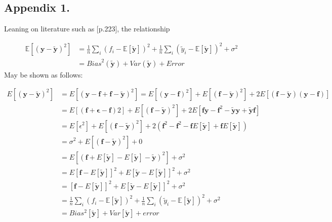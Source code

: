 \documentclass[%
oneside,                 %
final,                   %
10pt]{article}
\begin{document}
\begin{appendices}
\section*{Appendix 1.} \label{APP_1}
Leaning on literature such as \citep{HastieTrevor2009TEoS}[p.223], the relationship

\begin{align*}
\mathbb{E}\left[(\bm{y}-\bm{\tilde{y}})^2\right]&=\frac{1}{n}\sum_i(f_i-\mathbb{E}\left[\bm{\tilde{y}}\right])^2+\frac{1}{n}\sum_i(\tilde{y}_i-\mathbb{E}\left[\bm{\tilde{y}}\right])^2+\sigma^2 \\
&=\mathit{Bias}^2(\bm{\tilde{y}})+\mathit{Var}(\bm{\tilde{y}})+Error
\end{align*}
May be shown as follows:

\begin{align*}
E[(\bm{y}−\tilde{\bm{y}})^2]
&=E[(\bm{y}−\bm{f}+\bm{f}−\tilde{\bm{y}})^2]=E[(\bm{y}−\bm{f})^2]+E[(\bm{f}−\tilde{\bm{y}})^2]+2E[(\bm{f}−\tilde{\bm{y}})(\bm{y}−\bm{f})]\\
&=E[(\bm{f}+\bm{\epsilon}−\bm{f})2]+E[(\bm{f}−\tilde{\bm{y}})^2]+2E[\bm{f}\bm{y}−\bm{f}^2−\tilde{\bm{y}}\bm{y}+\tilde{\bm{y}}\bm{f}]\\
&=E[\epsilon^2]+E[(\bm{f}−\tilde{\bm{y}})^2]+2(\bm{f}^2−\bm{f}^2−\bm{f}E[\tilde{\bm{y}}]+\bm{f}E[\tilde{\bm{y}}])\\
&=\sigma^2+E[(\bm{f}−\tilde{\bm{y}})^2]+0\\
&=E[(\bm{f}+E[\tilde{\bm{y}}]−E[\tilde{\bm{y}}]−\tilde{\bm{y}})^2] + \sigma^2\\
&=E[\bm{f}−E[\tilde{\bm{y}}]]^2+E[\tilde{\bm{y}}−E[\tilde{\bm{y}}]]^2 + \sigma^2\\
&=[\bm{f}−E[\tilde{\bm{y}}]]^2+E[\tilde{\bm{y}}−E[\tilde{\bm{y}}]]^2 + \sigma^2\\
&=\frac{1}{n}\sum_i(f_i-\mathbb{E}\left[\bm{\tilde{y}}\right])^2+\frac{1}{n}\sum_i(\tilde{y}_i-\mathbb{E}\left[\bm{\tilde{y}}\right])^2+\sigma^2 \\
&=Bias^2[\tilde{\bm{y}}]+Var[\tilde{\bm{y}}] + error
\end{align*}


\end{appendices}
\end{document}
